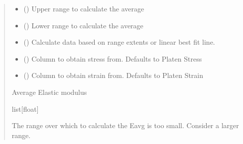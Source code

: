 \documentclass[letterpaper,10pt,english]{sphinxmanual}
\begin{document}
\begin{fulllineitems}
\begin{fulllineitems}
\begin{quote}
\begin{description}
\begin{itemize}
\item {} 
\sphinxAtStartPar
{} () \textendash{} Upper range to calculate the average

\item {} 
\sphinxAtStartPar
{} () \textendash{} Lower range to calculate the average

\item {} 
\sphinxAtStartPar
{} () \textendash{} Calculate data based on range extents or linear best fit line.

\item {} 
\sphinxAtStartPar
{} () \textendash{} Column to obtain stress from. Defaults to Platen Stress

\item {} 
\sphinxAtStartPar
{} () \textendash{} Column to obtain strain from. Defaults to Platen Strain

\end{itemize}

\sphinxAtStartPar
Average Elastic modulus

\sphinxAtStartPar
list{[}float{]}

\sphinxAtStartPar
{} \textendash{} The range over which to calculate the Eavg is too small. Consider a larger range.


\end{description}
\end{quote}
\end{fulllineitems}
\end{fulllineitems}
\end{document}
